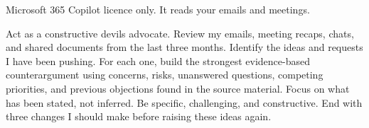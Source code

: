 \documentclass[9pt]{extarticle}
\newcommand{\exskip}{4.5mm}
\newcommand{\ex}[2]{\par\vspace{\exskip}\needspace{4\baselineskip}%
  {\setlength{\fboxsep}{2pt}\colorbox{accent}{\makebox[\widthof{\bfseries\small M365}][c]{\color{white}\bfseries\small\strut #1}}\hspace{1.5mm}{\bfseries\large #2}}\hspace{2.5mm}}
\newcommand{\note}[1]{{\small\color{muted}#1}\par}
\begin{document}
\ex{M365}{Devil's advocate on your own work}
\note{Microsoft 365 Copilot licence only. It reads your emails and meetings.}
\begin{pbox}
\textquotedbl{}Act as a constructive devil\textquotesingle{}s advocate. Review my emails, meeting recaps, chats, and shared documents from the last three months. Identify the ideas and requests I have been pushing. For each one, build the strongest evidence-{}based counterargument using concerns, risks, unanswered questions, competing priorities, and previous objections found in the source material. Focus on what has been stated, not inferred. Be specific, challenging, and constructive. End with three changes I should make before raising these ideas again.\textquotedbl{}\par
\end{pbox}
\end{document}
